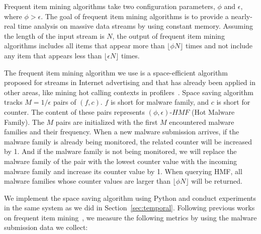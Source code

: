 Frequent item mining algorithms take two configuration parameters, $\phi$ and $\epsilon$, where $\phi > \epsilon$. 
The goal of frequent item mining algorithms is to provide a nearly-real time analysis on massive data streams by using constant memory. 
Assuming the length of the input stream is $N$, the output of frequent item mining algorithms 
includes all items that appear more than $\lfloor \phi N \rfloor$ times 
and not include any item that appears less than  $\lfloor \epsilon N \rfloor$ times. 

The frequent item mining algorithm we use is a space-efficient algorithm~\cite{space-saving} 
proposed for streams in Internet advertising and that has already been applied in other areas, 
like mining hot calling contexts in profilers~\cite{hot-calling-context}.
Space saving algorithm tracks $M=1/\epsilon$ pairs of $(f, c)$. 
$f$ is short for malware family, and $c$ is short for counter.  
The content of these pairs represents $(\phi, \epsilon)\mbox{-}HMF$ (Hot Malware Family). 
The $M$ pairs are initialized with the first $M$ encountered malware families and their frequency. 
When a new malware submission arrives, 
if the malware family is already being monitored, 
the related counter will be increased by 1. 
And if the malware family is not being monitored, 
we will replace the malware family of the pair with the lowest counter value with the incoming malware family
and increase its counter value by 1. 
When querying HMF, 
all malware families whose counter values are larger than $\lfloor \phi N \rfloor$ will be returned. 

We implement the space saving algorithm using Python
and conduct experiments in the same system as we did in Section~\ref{sec:temporal}.
Following previous works on frequent item mining~\cite{hot-calling-context}, 
we measure the following metrics by using the malware submission data we collect:


